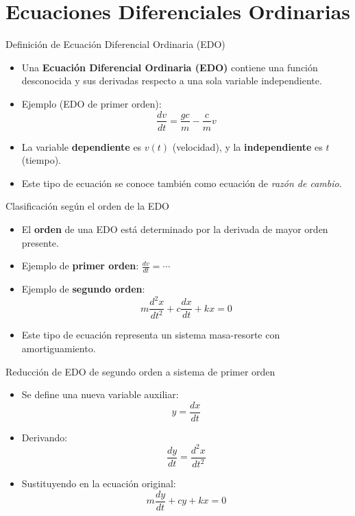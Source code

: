 \documentclass[main.tex]{subfiles}
\begin{document}
\section{Ecuaciones Diferenciales Ordinarias}

\begin{frame}{\small Definici\'on de Ecuaci\'on Diferencial Ordinaria (EDO)}
\begin{itemize}
  \item Una \textbf{Ecuaci\'on Diferencial Ordinaria (EDO)} contiene una funci\'on desconocida y sus derivadas respecto a una sola variable independiente.
  \item Ejemplo (EDO de primer orden):
  \[
    \frac{dv}{dt} = \frac{g c}{m} - \frac{c}{m}v
  \]
  \item La variable \textbf{dependiente} es $v(t)$ (velocidad), y la \textbf{independiente} es $t$ (tiempo).
  \item Este tipo de ecuaci\'on se conoce tambi\'en como ecuaci\'on de \emph{raz\'on de cambio}.
\end{itemize}
\end{frame}

\begin{frame}{\small Clasificaci\'on seg\'un el orden de la EDO}
\begin{itemize}
  \item El \textbf{orden} de una EDO est\'a determinado por la derivada de mayor orden presente.
  \item Ejemplo de \textbf{primer orden}: \( \frac{dv}{dt} = \cdots \)
  \item Ejemplo de \textbf{segundo orden}:
  \[
    m \frac{d^2x}{dt^2} + c \frac{dx}{dt} + kx = 0
  \]
  \item Este tipo de ecuaci\'on representa un sistema masa-resorte con amortiguamiento.
\end{itemize}
\end{frame}

\begin{frame}{\small Reducci\'on de EDO de segundo orden a sistema de primer orden}
\begin{itemize}
  \item Se define una nueva variable auxiliar:
  \[
    y = \frac{dx}{dt}
  \]
  \item Derivando:
  \[
    \frac{dy}{dt} = \frac{d^2x}{dt^2}
  \]
  \item Sustituyendo en la ecuaci\'on original:
  \[
    m \frac{dy}{dt} + c y + k x = 0
  \]
\end{itemize}
\end{frame}
\end{document}

